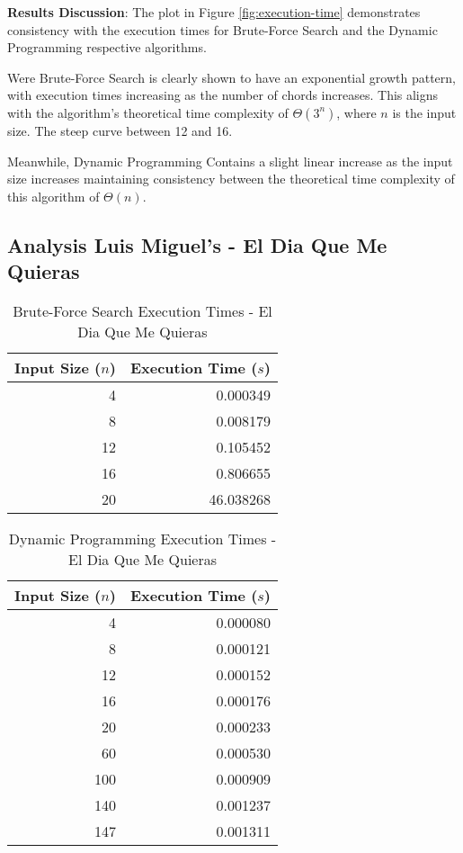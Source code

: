 \documentclass[conference]{IEEEtran}
\begin{document}
\textbf{Results Discussion}: The plot in Figure \ref{fig:execution-time} demonstrates consistency with the execution times for Brute-Force Search and the Dynamic Programming respective algorithms. 

Were Brute-Force Search is clearly shown to have an exponential growth pattern, with execution times increasing as the number of chords increases. This aligns with the algorithm's theoretical time complexity of $\Theta(3^{n})$, where $n$ is the input size. The steep curve between 12 and 16.

Meanwhile, Dynamic Programming Contains a slight linear increase as the input size increases maintaining consistency between the theoretical time complexity of this algorithm of $\Theta(n)$. 

\subsection{Analysis Luis Miguel's - El Dia Que Me Quieras}
\begin{table}[H]
    \centering 
    \caption{Brute-Force Search Execution Times - El Dia Que Me Quieras}
    \renewcommand{\arraystretch}{1.2} %
    \setlength{\tabcolsep}{3pt} %
    \begin{tabular}{r r}
        \toprule 
        \textbf{Input Size ($n$)} & \textbf{Execution Time ($s$)} \\
        \midrule
        4 & 0.000349 \\
        8 & 0.008179 \\
        12 & 0.105452 \\
        16 & 0.806655 \\ 
        20 & 46.038268 \\
        \bottomrule
    \end{tabular}
\end{table}
\begin{table}[H]
    \centering
    \caption{Dynamic Programming Execution Times - El Dia Que Me Quieras}
    \renewcommand{\arraystretch}{1.2} %
    \setlength{\tabcolsep}{3pt} %
    \begin{tabular}{r r}
        \toprule 
        \textbf{Input Size ($n$)} & \textbf{Execution Time ($s$)} \\
        \midrule 
        4 & 0.000080 \\
        8 & 0.000121 \\
        12 & 0.000152 \\
        16 & 0.000176 \\
        20 & 0.000233 \\
        60 & 0.000530 \\
        100 & 0.000909 \\
        140 & 0.001237 \\
        147 & 0.001311 \\
        \bottomrule
    \end{tabular}
\end{table}
\end{document}
